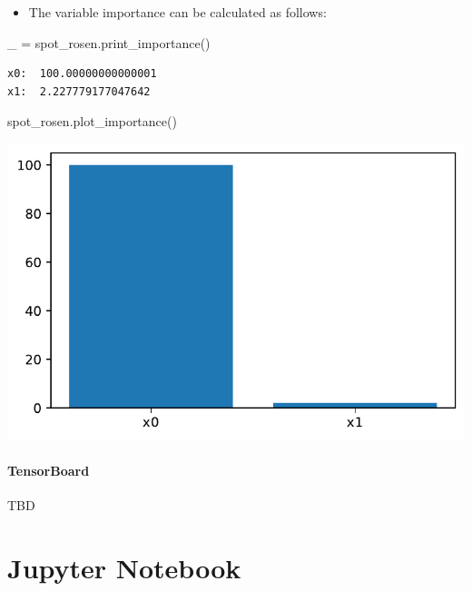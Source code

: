 \documentclass[
  letterpaper,
  DIV=11,
  numbers=noendperiod]{scrreprt}
\let\oldparagraph\paragraph
\renewcommand{\paragraph}[1]{\oldparagraph{#1}\mbox{}}
\newenvironment{Shaded}{\begin{snugshade}}{\end{snugshade}}
\newcommand{\NormalTok}[1]{\textcolor[rgb]{0.00,0.23,0.31}{#1}}
\newcommand{\OperatorTok}[1]{\textcolor[rgb]{0.37,0.37,0.37}{#1}}
\providecommand{\tightlist}{%
  \setlength{\itemsep}{0pt}\setlength{\parskip}{0pt}}\usepackage{longtable,booktabs,array}
\begin{document}
\begin{itemize}
\tightlist
\item
  The variable importance can be calculated as follows:
\end{itemize}

\begin{Shaded}
\begin{Highlighting}[]
\NormalTok{\_ }\OperatorTok{=}\NormalTok{ spot\_rosen.print\_importance()}
\end{Highlighting}
\end{Shaded}

\begin{verbatim}
x0:  100.00000000000001
x1:  2.227779177047642
\end{verbatim}

\begin{Shaded}
\begin{Highlighting}[]
\NormalTok{spot\_rosen.plot\_importance()}
\end{Highlighting}
\end{Shaded}

\includegraphics{009_num_spot_anisotropic_files/figure-pdf/cell-28-output-1.pdf}

\paragraph{TensorBoard}\label{tensorboard-6}

TBD

\section{Jupyter Notebook}\label{jupyter-notebook-8}
\end{document}
